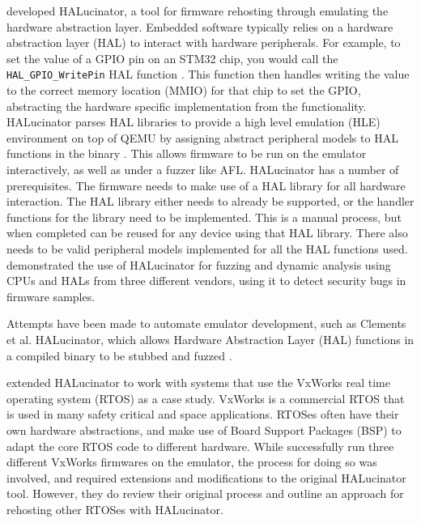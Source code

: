 \documentclass[../report.tex]{subfiles}
\begin{document}
\citet{HALucinator_2020} developed HALucinator, a tool for firmware rehosting
through emulating the hardware abstraction layer. Embedded software typically
relies on a hardware abstraction layer (HAL) to interact with hardware
peripherals. For example, to set the value of a GPIO pin on an STM32 chip, you
would call the \lstinline{HAL_GPIO_WritePin} HAL function \citep{stm32hal}.
This function then handles writing the value to the correct memory location
(MMIO) for that chip to set the GPIO, abstracting the hardware specific
implementation from the functionality. HALucinator parses HAL libraries to
provide a high level emulation (HLE) environment on top of QEMU by assigning
abstract peripheral models to HAL functions in the binary
\citep{HALucinator_2020}. This allows firmware to be run on the emulator
interactively, as well as under a fuzzer like AFL. HALucinator has a number of
prerequisites. The firmware needs to make use of a HAL library for all hardware
interaction. The HAL library either needs to already be supported, or the
handler functions for the library need to be implemented. This is a manual
process, but when completed can be reused for any device using that HAL
library. There also needs to be valid peripheral models implemented for all the
HAL functions used. \citet{HALucinator_2020} demonstrated the use of
HALucinator for fuzzing and dynamic analysis using CPUs and HALs from three
different vendors, using it to detect security bugs in firmware samples.

Attempts have been made to automate emulator development, such as Clements et
al. HALucinator, which allows Hardware Abstraction Layer (HAL) functions in a
compiled binary to be stubbed and fuzzed \citep{Clements_2021}.

\citet{Clements_2021} extended HALucinator to work with systems that use the
VxWorks real time operating system (RTOS) as a case study. VxWorks is a
commercial RTOS that is used in many safety critical and space applications.
RTOSes often have their own hardware abstractions, and make use of Board
Support Packages (BSP) to adapt the core RTOS code to different hardware.
While \citet{Clements_2021} successfully run three different VxWorks firmwares
on the emulator, the process for doing so was involved, and required extensions
and modifications to the original HALucinator tool. However, they do review
their original process and outline an approach for rehosting other RTOSes with
HALucinator.
\end{document}
